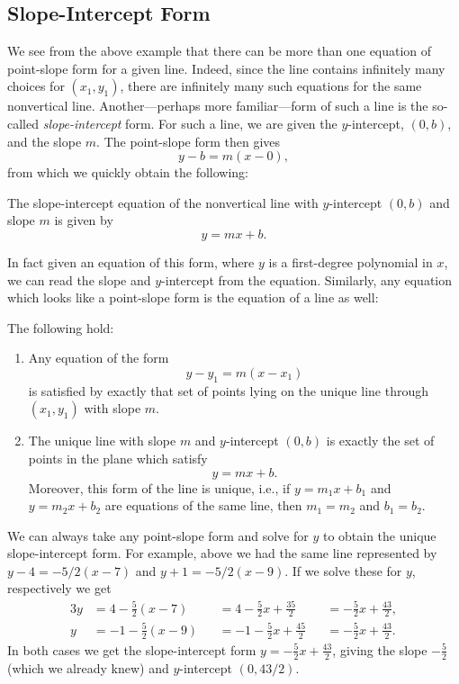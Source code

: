 \subsection{Slope-Intercept Form}
We see from the above example that there can be more than one
equation of point-slope form for a given line.  Indeed, since
the line contains infinitely many choices for $(x_1,y_1)$,
there are infinitely many such equations for the same nonvertical line.
Another---perhaps more familiar---form of such a line is the
so-called {\it slope-intercept} form.  For such a line, we
are given the $y$-intercept, $(0,b)$, and the slope $m$.
The point-slope form then gives
$$y-b=m(x-0),$$
from which we quickly obtain the following:
\begin{definition}The {\rm slope-intercept} equation 
of the nonvertical line with $y$-intercept $(0,b)$ and slope $m$
is given by 
\begin{equation}y=mx+b.\label{SlopeIntercept}
\end{equation}\end{definition}
In fact given an equation of this form, where
$y$ is a first-degree polynomial in $x$, we can read
the slope and $y$-intercept from the equation.  Similarly,
any equation which looks like a point-slope form is
the equation of a line as well:
\begin{theorem}\label{EquationsOfLinesTheorem}  The following hold:
\begin{enumerate}
\item
Any equation of the form $$y-y_1=m(x-x_1)$$ is satisfied
by exactly that set of points lying on the unique line
through $(x_1,y_1)$ with slope $m$. 
\item
The unique line with slope $m$ and $y$-intercept $(0,b)$ is
exactly the set of points in the plane which satisfy
$$y=mx+b.$$
Moreover, this form of the line is unique, i.e., if
$y=m_1x+b_1$ and $y=m_2x+b_2$ are equations of the same line,
then $m_1=m_2$ and $b_1=b_2$.
\end{enumerate}
\end{theorem}
We can always take any point-slope form
and solve for $y$ to obtain the unique slope-intercept form.
For example, above we had the same line represented by 
$y-4=-5/2(x-7)$ and $y+1=-5/2(x-9)$.
If we solve these for $y$, respectively  we get
\begin{alignat*}3
y&=4-\frac52(x-7)&&=4-\frac52x+\frac{35}2&&=-\frac52x+\frac{43}2,\\
y&=-1-\frac52(x-9)&&=-1-\frac52x+\frac{45}2&&=-\frac52x+\frac{43}2.
\end{alignat*}
In both cases we get the slope-intercept form $y=-\frac52x+\frac{43}2$,
giving the slope $-\frac52$ (which we already knew) and $y$-intercept
$(0,43/2)$.

